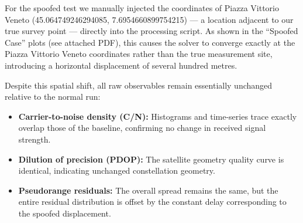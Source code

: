         \noindent For the spoofed test we manually injected the coordinates of Piazza Vittorio Veneto (45.064749246294085, 7.6954660899754215) — a location adjacent to our true survey point — directly into the processing script. 
        As shown in the “Spoofed Case” plots (see attached PDF), this causes the solver to converge exactly at the Piazza Vittorio Veneto coordinates rather than the true measurement site, introducing a horizontal displacement of several hundred metres.
        
        \noindent Despite this spatial shift, all raw observables remain essentially unchanged relative to the normal run:
        
        \begin{itemize}
            \item \textbf{Carrier-to-noise density (C/N):} Histograms and time-series trace exactly overlap those of the baseline, confirming no change in received signal strength.
            \item \textbf{Dilution of precision (PDOP):} The satellite geometry quality curve is identical, indicating unchanged constellation geometry.
            \item \textbf{Pseudorange residuals:} The overall spread remains the same, but the entire residual distribution is offset by the constant delay corresponding to the spoofed displacement.
        \end{itemize}

